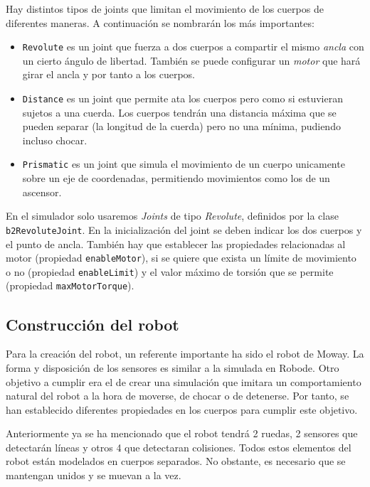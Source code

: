 Hay distintos tipos de joints que limitan el movimiento de los cuerpos de diferentes maneras. A continuación se nombrarán los más importantes:

\begin{itemize}
	\item \texttt{Revolute} es un joint que fuerza a dos cuerpos a compartir el mismo \emph{ancla} con un cierto ángulo de libertad. También se puede configurar un \emph{motor} que hará girar el ancla y por tanto a los cuerpos.
	\item \texttt{Distance} es un joint que permite ata los cuerpos pero como si estuvieran sujetos a una cuerda. Los cuerpos tendrán una distancia máxima que se pueden separar (la longitud de la cuerda) pero no una mínima, pudiendo incluso chocar.
	\item \texttt{Prismatic} es un joint que simula el movimiento de un cuerpo unicamente sobre un eje de coordenadas, permitiendo movimientos como los de un ascensor.
\end{itemize}

En el simulador solo usaremos \emph{Joints} de tipo \emph{Revolute}, definidos por la clase \texttt{b2RevoluteJoint}.  En la inicialización del joint se deben indicar los dos cuerpos y el punto de ancla. También hay que establecer las propiedades relacionadas al motor (propiedad \texttt{enableMotor}), si se quiere que exista un límite de movimiento o no (propiedad \texttt{enableLimit}) y el valor máximo de torsión que se permite (propiedad \texttt{maxMotorTorque}).

\subsection{Construcción del robot}
\label{sec:contruccion-robot}

Para la creación del robot, un referente importante ha sido el robot de Moway. La forma y disposición de los sensores es similar a la simulada en Robode. Otro objetivo a cumplir era el de crear una simulación que imitara un comportamiento natural del robot a la hora de moverse, de chocar o de detenerse. Por tanto, se han establecido diferentes propiedades en los cuerpos para cumplir este objetivo.

Anteriormente ya se ha mencionado que el robot tendrá 2 ruedas, 2 sensores que detectarán líneas y otros 4 que detectaran colisiones. Todos estos elementos del robot están modelados en cuerpos separados. No obstante, es necesario que se mantengan unidos y se muevan a la vez.

